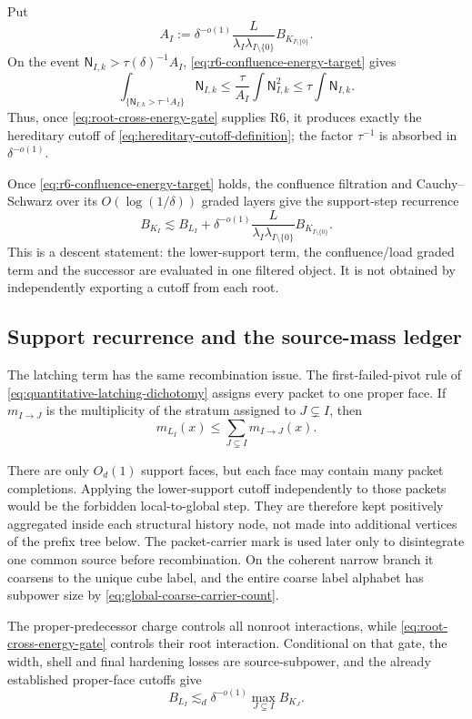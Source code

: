 \documentclass[11pt]{article}
\begin{document}
Put
\[
 A_I
 :=
 \delta^{-o(1)}
 \frac{L}{\lambda_I\lambda_{I\setminus\{0\}}}
 B_{K_{I\setminus\{0\}}}.
\]
On the event \(\mathsf N_{I,k}>\tau(\delta)^{-1}A_I\),
\eqref{eq:r6-confluence-energy-target} gives
\[
 \int_{\{\mathsf N_{I,k}>\tau^{-1}A_I\}}\mathsf N_{I,k}
 \le
 \frac{\tau}{A_I}\int\mathsf N_{I,k}^2
 \le
 \tau\int\mathsf N_{I,k}.
\]
Thus, once \eqref{eq:root-cross-energy-gate} supplies R6, it produces exactly
the hereditary cutoff of
\eqref{eq:hereditary-cutoff-definition}; the factor \(\tau^{-1}\) is absorbed
in \(\delta^{-o(1)}\).

Once \eqref{eq:r6-confluence-energy-target} holds, the confluence filtration
and Cauchy--Schwarz over its \(O(\log(1/\delta))\) graded layers give the
support-step recurrence
\begin{equation}\label{eq:global-support-recurrence}
 \boxed{
 B_{K_I}
 \lesssim
 B_{L_I}
 +
 \delta^{-o(1)}
 \frac{L}{\lambda_I\lambda_{I\setminus\{0\}}}
 B_{K_{I\setminus\{0\}}}.}
\end{equation}
This is a descent statement: the lower-support term, the confluence/load
graded term and the successor are evaluated in one filtered object.  It is not
obtained by independently exporting a cutoff from each root.

\subsection{Support recurrence and the source-mass ledger}

The latching term has the same recombination issue.  The
first-failed-pivot rule of \eqref{eq:quantitative-latching-dichotomy} assigns
every packet to one proper face.  If \(m_{I\to J}\) is the multiplicity of the
stratum assigned to \(J\subsetneq I\), then
\[
 m_{L_I}(x)
 \le
\sum_{J\subsetneq I}m_{I\to J}(x).
\]

There are only \(O_d(1)\) support faces, but each face may contain many packet
completions.  Applying the lower-support cutoff independently to those packets
would be the forbidden local-to-global step.  They are therefore kept
positively aggregated inside each structural history node, not made into
additional vertices of the prefix tree below.  The packet-carrier mark is used
later only to disintegrate one common source before recombination.  On the
coherent narrow branch it coarsens to the unique cube label, and the entire
coarse label alphabet has subpower size by
\eqref{eq:global-coarse-carrier-count}.

The proper-predecessor charge controls all nonroot interactions, while
\eqref{eq:root-cross-energy-gate} controls their root interaction.  Conditional
on that gate, the width, shell and final hardening losses are source-subpower,
and the already established proper-face cutoffs give
\begin{equation}\label{eq:latching-cutoff}
 \boxed{
 B_{L_I}
 \lesssim_d
 \delta^{-o(1)}
 \max_{J\subsetneq I}B_{K_J}.}
\end{equation}
\end{document}

